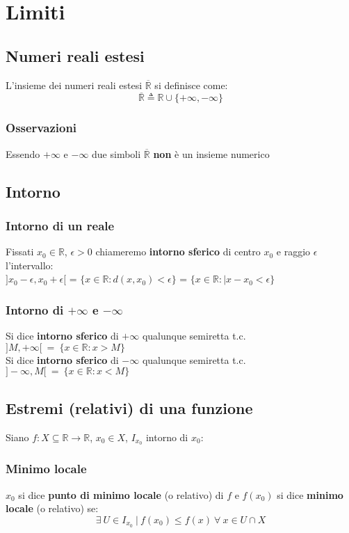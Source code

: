 \chapter{Limiti}
\section{Numeri reali estesi}
L'insieme dei numeri reali estesi $\overline{\mathbb{R}}$ si definisce come:
\begin{equation}
\overline{\mathbb{R}} \triangleq \mathbb{R} \cup \{+\infty,-\infty\}
\end{equation}
\subsection{Osservazioni}
Essendo $+\infty$ e $-\infty$ due simboli $\overline{\mathbb{R}}$ \textbf{non} è un insieme numerico

\section{Intorno}
\subsection{Intorno di un reale}
Fissati $x_0 \in \mathbb{R}$, $\epsilon >0$ chiameremo \textbf{intorno sferico} di centro $x_0$ e raggio $\epsilon$ l'intervallo:\\
$]x_0-\epsilon ,x_0+\epsilon[$ = $\{x \in \mathbb{R}:d(x,x_0)<\epsilon \}$ = $\{x \in \mathbb{R}: |x-x_0<\epsilon \}$
\subsection{Intorno di $+\infty$ e $-\infty$ }
Si dice \textbf{intorno sferico} di $+\infty$ qualunque semiretta t.c. $]M,+\infty[\ =\ \{x \in \mathbb{R}: x>M\}$ \\
Si dice \textbf{intorno sferico} di $-\infty$ qualunque semiretta t.c. $]-\infty ,M[\ =\ \{x \in \mathbb{R}: x<M\}$

\section{Estremi (relativi) di una funzione}
Siano $f:X \subseteq \mathbb{R} \rightarrow \mathbb{R}$, $x_0 \in X$, $I_{x_0}$ intorno di $x_0$:
\subsection{Minimo locale}
$x_0$ si dice \textbf{punto di minimo locale} (o relativo) di $f$ e $f(x_0)$ si dice \textbf{minimo locale} (o relativo) se:
\begin{equation}
\exists \ U \in I_{x_0}\ |\ f(x_0) \le f(x)\ \forall\ x \in U \cap X
\end{equation}
